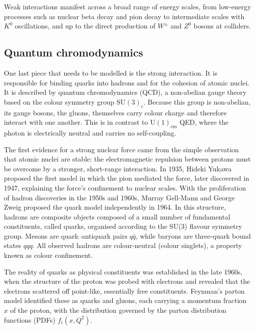 \vspace{0.5 cm}

Weak interactions manifest across a broad range of energy scales, from low-energy processes such as nuclear beta decay and pion decay to intermediate scales with $K^0$ oscillations, and up to the direct production of $W^\pm$ and $Z^0$ bosons at colliders.


\subsection{Quantum chromodynamics}

One last piece that needs to be modelled is the strong interaction. It is responsible for binding quarks into hadrons and for the cohesion of atomic nuclei. It is described by quantum chromodynamics (QCD), a non-abelian gauge theory based on the colour symmetry group $\mathrm{SU}(3)_c$. Because this group is non-abelian, its gauge bosons, the gluons, themselves carry colour charge and therefore interact with one another. This is in contrast to $\mathrm{U}(1)_{\mathrm{em}}$ QED, where the photon is electrically neutral and carries no self-coupling.

\vspace{0.5 cm}

The first evidence for a strong nuclear force came from the simple observation that atomic nuclei are stable: the electromagnetic repulsion between protons must be overcome by a stronger, short-range interaction. In 1935, Hideki Yukawa proposed the first model in which the pion mediated the force, later discovered in 1947, explaining the force's confinement to nuclear scales. With the proliferation of hadron discoveries in the 1950s and 1960s, Murray Gell-Mann and George Zweig proposed the quark model independently in 1964. In this structure, hadrons are composite objects composed of a small number of fundamental constituents, called quarks, organised according to the SU(3) flavour symmetry group. Mesons are quark--antiquark pairs $q\bar{q}$, while baryons are three-quark bound states $qqq$. All observed hadrons are colour-neutral (colour singlets), a property known as colour confinement.

The reality of quarks as physical constituents was established in the late 1960s, when the structure of the proton was probed with electrons and revealed that the electrons scattered off point-like, essentially free constituents. Feynman's parton model identified these as quarks and gluons, each carrying a momentum fraction $x$ of the proton, with the distribution governed by the parton distribution functions (PDFs) $f_i(x, Q^2)$.

